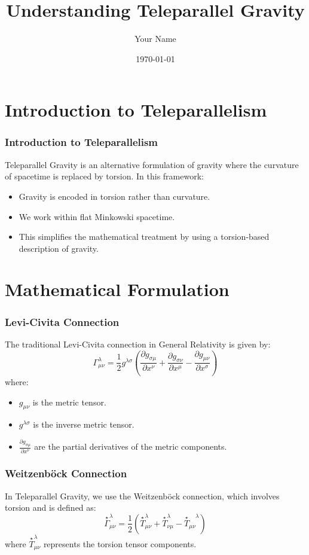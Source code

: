 \documentclass{beamer}
\title{Understanding Teleparallel Gravity}
\author{Your Name}
\date{\today}
\begin{document}
\frame{\titlepage}

\section{Introduction to Teleparallelism}
\begin{frame}
  \frametitle{Introduction to Teleparallelism}
  Teleparallel Gravity is an alternative formulation of gravity where the curvature of spacetime is replaced by torsion. In this framework:
  \begin{itemize}
    \item Gravity is encoded in torsion rather than curvature.
    \item We work within flat Minkowski spacetime.
    \item This simplifies the mathematical treatment by using a torsion-based description of gravity.
  \end{itemize}
\end{frame}

\section{Mathematical Formulation}
\begin{frame}
  \frametitle{Levi-Civita Connection}
  The traditional Levi-Civita connection in General Relativity is given by:
  \[
  \Gamma^\lambda_{\mu \nu} = \frac{1}{2} g^{\lambda \sigma} \left( \frac{\partial g_{\sigma \mu}}{\partial x^\nu} + \frac{\partial g_{\sigma \nu}}{\partial x^\mu} - \frac{\partial g_{\mu \nu}}{\partial x^\sigma} \right)
  \]
  where:
  \begin{itemize}
    \item $g_{\mu \nu}$ is the metric tensor.
    \item $g^{\lambda \sigma}$ is the inverse metric tensor.
    \item $\frac{\partial g_{\sigma \mu}}{\partial x^\nu}$ are the partial derivatives of the metric components.
  \end{itemize}
\end{frame}

\begin{frame}
  \frametitle{Weitzenböck Connection}
  In Teleparallel Gravity, we use the Weitzenböck connection, which involves torsion and is defined as:
  \[
  \overset{\star}{\Gamma}^\lambda_{\mu \nu} = \frac{1}{2} \left( \overset{\star}{T}^\lambda_{\mu \nu} + \overset{\star}{T}^\lambda_{\nu \mu} - \overset{\star}{T}_{\mu \nu}^{\phantom{\mu \nu}\lambda} \right)
  \]
  where $\overset{\star}{T}^\lambda_{\mu \nu}$ represents the torsion tensor components.
\end{frame}
\end{document}
